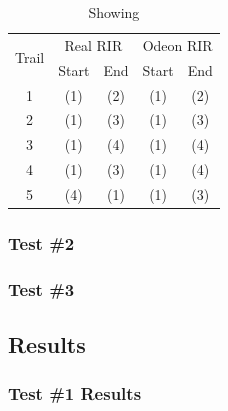 \documentclass[../../main.tex]{subfiles}
\begin{document}

			\begin{table}[H]
				\begin{center}
				    \begin{tabular}{|c|cc|cc|} \hline
				        \multirow{2}{*}{Trail} & \multicolumn{2}{c|}{Real RIR} & \multicolumn{2}{c|}{Odeon RIR}\\ \cline{2-5}
				            & Start & End & Start & End \\ \hline
				          1 & (1) & (2) & (1) & (2) \\
				          2 & (1) & (3) & (1) & (3)\\
				          3 & (1) & (4) & (1) & (4)\\ \hline
				          4 & (1) & (3) & (1) & (4)  \\ 
				          5 & (4) & (1) & (1) & (3) \\ \hline
				    \end{tabular}
				    \caption{Showing}
				    \label{test1Procedure}
				\end{center}
			\end{table}


		\subsubsection{Test \#2}

		\subsubsection{Test \#3}


	\subsection{Results}

		\subsubsection{Test \#1 Results}
\end{document}
